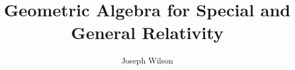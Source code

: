 \newif\ifdebug

\debugtrue





\title{Geometric Algebra for Special and General Relativity}
\author{Joseph Wilson}





	\maketitle
	\tableofcontents

\restoregeometry %


\ifdebug
	
\fi







